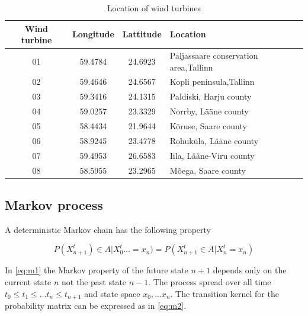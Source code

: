 \begin{table}[!htbp]
\centering
\begin{tabular}{cccl} \hline
Wind turbine & Longitude		& Lattitude & Location\\ \hline
01	&	59.4784	&		24.6923	&	Paljassaare conservation area,Tallinn				\\
02	&	59.4646	&		24.6567	&	Kopli peninsula,Tallinn				\\
03	&	59.3416	&		24.1315	&	Paldiski, Harju county				\\
04	&	59.0257	&		23.3329	&	Norrby, Lääne county				\\
05	&	58.4434	&		21.9644	&	Kõruse, Saare county				\\
06	&	58.9245	&		23.4778	&	Rohuküla, Lääne county				\\
07	&	59.4953	&		26.6583	&	Iila, Lääne-Viru county				\\
08	&	58.5955	&		23.2965	&	Mõega, Saare county				\\ \hline
\end{tabular}
\caption{Location of wind turbines}
\label{tbl:spatial}
\end{table}



\subsection{Markov process}
A deterministic Markov chain has the following property

\begin{equation} \label{eq:m1}
P(X_{n+1}^t) \in A | X_0^t \ldots = x_n ) = P ( X^t_{n+1} \in A | X_n^t = x_n )
\end{equation}

In \ref{eq:m1} the Markov property of the future state $n+1$ depends only on the current state $n$ not the past state $n-1$. The process spread over all time $t_0 \leq t_1 \leq \ldots t_n \leq t_{n+1}$ and state space $x_0, \ldots x_n$. The transition kernel for the probability matrix can be expressed as in \ref{eq:m2}.

